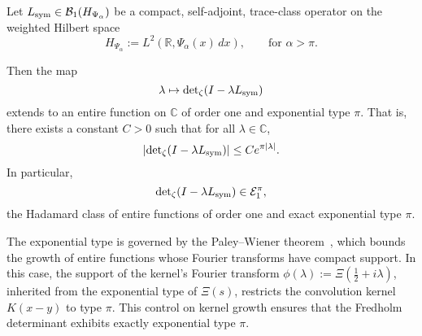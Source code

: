 \begin{lemma}
\label{lem:det_identity_entire_order_one}
Let \( L_{\mathrm{sym}} \in \mathcal{B}_1(H_{\Psi_\alpha}) \) be a compact, self-adjoint, trace-class operator on the weighted Hilbert space
\[
H_{\Psi_\alpha} := L^2(\mathbb{R}, \Psi_\alpha(x)\, dx), \qquad \text{for } \alpha > \pi.
\]

Then the map
\[
\lambda \mapsto \det\nolimits_{\zeta}(I - \lambda L_{\mathrm{sym}})
\]
extends to an entire function on \( \mathbb{C} \) of order one and exponential type \( \pi \). That is, there exists a constant \( C > 0 \) such that for all \( \lambda \in \mathbb{C} \),
\[
\left| \det\nolimits_{\zeta}(I - \lambda L_{\mathrm{sym}}) \right| \le C e^{\pi |\lambda|}.
\]
In particular,
\[
\det\nolimits_{\zeta}(I - \lambda L_{\mathrm{sym}}) \in \mathcal{E}_1^\pi,
\]
the Hadamard class of entire functions of order one and exact exponential type \( \pi \).

\medskip
\noindent
The exponential type is governed by the Paley--Wiener theorem~\cite[Ch.~9]{Levin1996EntireLectures}, which bounds the growth of entire functions whose Fourier transforms have compact support. In this case, the support of the kernel’s Fourier transform \( \phi(\lambda) := \Xi(\tfrac{1}{2} + i\lambda) \), inherited from the exponential type of \( \Xi(s) \), restricts the convolution kernel \( K(x - y) \) to type \( \pi \). This control on kernel growth ensures that the Fredholm determinant exhibits exactly exponential type \( \pi \).
\end{lemma}
